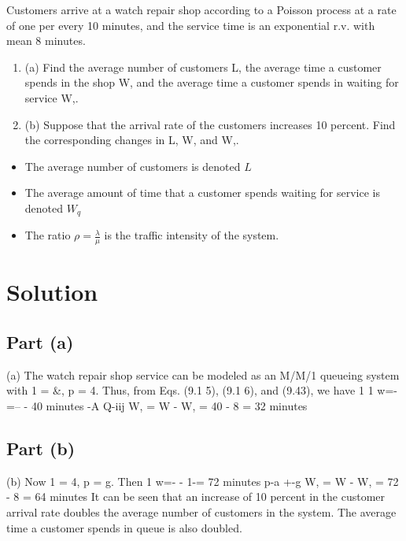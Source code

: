 
\setcounter{MaxMatrixCols}{10}


\large 




Customers arrive at a watch repair shop according to a Poisson process at a rate of one per 
every 10 minutes, and the service time is an exponential r.v. with mean 8 minutes. 
\begin{enumerate}
    \item (a) Find the average number of customers L, the average time a customer spends in the shop 
W, and the average time a customer spends in waiting for service W,. 
\item  
(b) Suppose that the arrival rate of the customers increases 10 percent. Find the corresponding 
changes in L, W, and W,. 
\end{enumerate}



\begin{framed}
\begin{itemize}
\item The average number of customers is denoted $L$
\item The average amount of time that a customer spends waiting for service is denoted $W_q$
    \item  The ratio ${\rho = \frac{\lambda}{\mu}}$ is the traffic intensity of the system.
\end{itemize}
\end{framed}
\section*{Solution}
\subsection*{Part (a)}

(a) The watch repair shop service can be modeled as an M/M/1 queueing system with 1 = &, p = 4. Thus, 
from Eqs. (9.1 5), (9.1 6), and (9.43), we have 
1 1 w=-=-- - 40 minutes 
-A Q-iij 
W, = W - W, = 40 - 8 = 32 minutes 

\subsection*{Part (b)}
(b) Now 1 = 4, p = g. Then 
1 w=- - 1-= 72 minutes 
p-a +-g 
W, = W - W, = 72 - 8 = 64 minutes 
It can be seen that an increase of 10 percent in the customer arrival rate doubles the average number 
of customers in the system. The average time a customer spends in queue is also doubled.




